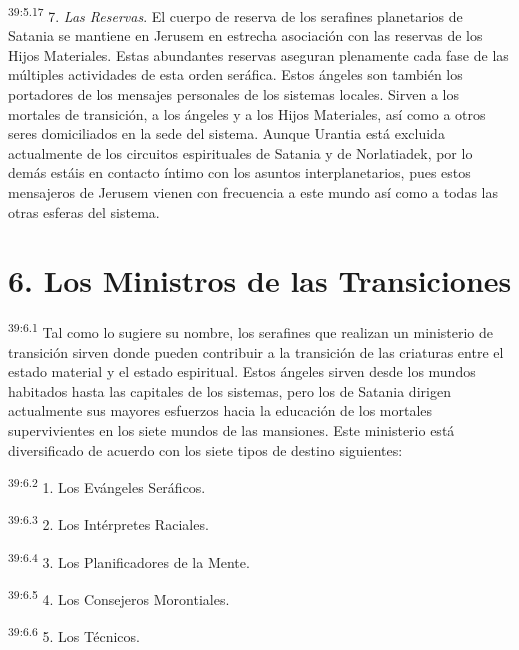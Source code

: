 \par
\textsuperscript{39:5.17} 7. \textit{Las Reservas}. El cuerpo de reserva de los serafines planetarios de Satania se mantiene en Jerusem en estrecha asociación con las reservas de los Hijos Materiales. Estas abundantes reservas aseguran plenamente cada fase de las múltiples actividades de esta orden seráfica. Estos ángeles son también los portadores de los mensajes personales de los sistemas locales. Sirven a los mortales de transición, a los ángeles y a los Hijos Materiales, así como a otros seres domiciliados en la sede del sistema. Aunque Urantia está excluida actualmente de los circuitos espirituales de Satania y de Norlatiadek, por lo demás estáis en contacto íntimo con los asuntos interplanetarios, pues estos mensajeros de Jerusem vienen con frecuencia a este mundo así como a todas las otras esferas del sistema.

\section*{6. Los Ministros de las Transiciones}
\par
\textsuperscript{39:6.1} Tal como lo sugiere su nombre, los serafines que realizan un ministerio de transición sirven donde pueden contribuir a la transición de las criaturas entre el estado material y el estado espiritual. Estos ángeles sirven desde los mundos habitados hasta las capitales de los sistemas, pero los de Satania dirigen actualmente sus mayores esfuerzos hacia la educación de los mortales supervivientes en los siete mundos de las mansiones. Este ministerio está diversificado de acuerdo con los siete tipos de destino siguientes:

\par
\textsuperscript{39:6.2} 1. Los Evángeles Seráficos.

\par
\textsuperscript{39:6.3} 2. Los Intérpretes Raciales.

\par
\textsuperscript{39:6.4} 3. Los Planificadores de la Mente.

\par
\textsuperscript{39:6.5} 4. Los Consejeros Morontiales.

\par
\textsuperscript{39:6.6} 5. Los Técnicos.

